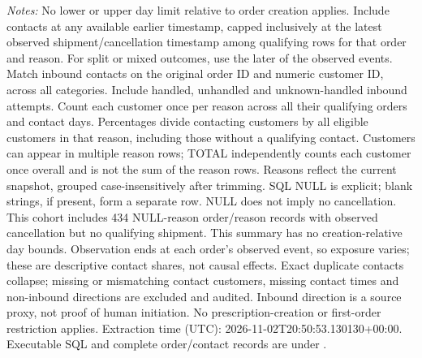 \begin{table}[!htbp]
\begin{minipage}{\linewidth}
\footnotesize
\textit{Notes:} No lower or upper day limit relative to order creation applies.
Include contacts at any available earlier timestamp, capped inclusively at the
latest observed shipment/cancellation timestamp among
qualifying rows for that order and reason. For split or mixed outcomes, use the
later of the observed events. Match inbound contacts on the original order ID
and numeric customer ID, across all categories. Include handled, unhandled and unknown-handled inbound attempts.
Count each customer once per reason across all their qualifying orders and
contact days. Percentages divide contacting customers by all eligible customers
in that reason, including those without a qualifying contact. Customers can
appear in multiple reason rows; TOTAL independently counts each customer once
overall and is not the sum of the reason rows. Reasons reflect the current
snapshot, grouped case-insensitively after trimming. SQL NULL is explicit;
blank strings, if present, form a separate row. NULL does not imply no cancellation.
This cohort includes 434
NULL-reason order/reason records with observed cancellation but no qualifying
shipment. This summary has no creation-relative day bounds.
Observation ends at each order's observed
event, so exposure varies; these are descriptive contact shares, not causal effects.
Exact duplicate contacts collapse; missing or mismatching contact customers,
missing contact times and non-inbound directions are excluded and audited.
Inbound direction is a source proxy, not proof of human initiation.
No prescription-creation or first-order restriction applies.
Extraction time (UTC): 2026-11-02T20:50:53.130130+00:00.
Executable SQL and complete order/contact records are under
.
\end{minipage}
\end{table}

